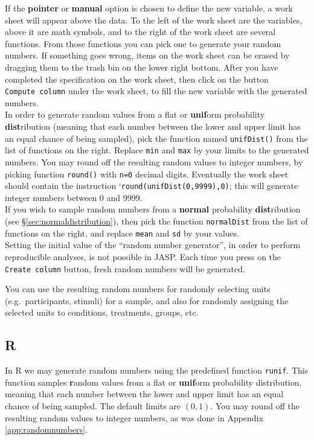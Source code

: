 \documentclass[
]{book}
\begin{document}
If the \textbf{pointer} or \textbf{manual} option is chosen to define the new variable, a work sheet will appear above the data. To the left of the work sheet are the variables, above it are math symbols, and to the right of the work sheet are several functions. From those functions you can pick one to generate your random numbers. If something goes wrong, items on the work sheet can be erased by dragging them to the trash bin on the lower right bottom. After you have completed the specification on the work sheet, then click on the button \texttt{Compute\ column} under the work sheet, to fill the new variable with the generated numbers.\\
In order to generate random values from a flat or \textbf{unif}orm probability \textbf{dist}ribution (meaning that each number between the lower and upper limit has an equal chance of being sampled), pick the function named \texttt{unifDist()} from the list of functions on the right. Replace \texttt{min} and \texttt{max} by your limits to the generated numbers. You may round off the resulting random values to integer numbers, by picking function \texttt{round()} with \texttt{n=0} decimal digits. Eventually the work sheet should contain the instruction `\texttt{round(unifDist(0,9999),0)}; this will generate integer numbers between 0 and 9999.\\
If you wish to sample random numbers from a \textbf{normal} probability \textbf{dist}ribution (see §\ref{sec:normaldistribution}), then pick the function \texttt{normalDist} from the list of functions on the right, and replace \texttt{mean} and \texttt{sd} by your values.\\

Setting the initial value of the ``random number generator'', in order to perform reproducible analyses, is not possible in JASP. Each time you press on the \texttt{Create\ column} button, fresh random numbers will be generated.

You can use the resulting random numbers for randomly selecting units (e.g.~participants, stimuli) for a sample, and also for randomly assigning the selected units to conditions, treatments, groups, etc.

\hypertarget{r}{%
\subsection{R}\label{r}}

In R we may generate random numbers using the predefined function \texttt{runif}.
This function samples \textbf{r}andom values from a flat or \textbf{unif}orm probability distribution, meaning that each number between the lower and upper limit has an equal chance of being sampled. The default limits are \((0,1)\). You may round off the resulting random values to integer numbers, as was done in Appendix \ref{app:randomnumbers}.
\end{document}
